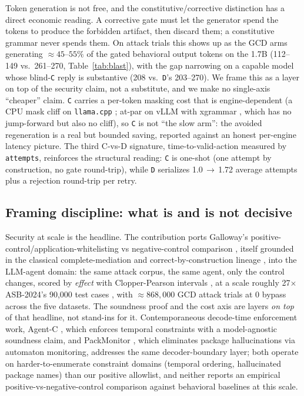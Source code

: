 Token generation is not free, and the constitutive/corrective distinction has a direct economic reading. A corrective gate must let the generator spend the tokens to produce the forbidden artifact, then discard them; a constitutive grammar never spends them. On attack trials this shows up as the GCD arms generating $\approx\!45\text{--}55\%$ of the gated behavioral output tokens on the 1.7B (112--149 vs.\ 261--270, Table~\ref{tab:blast}), with the gap narrowing on a capable model whose blind-\texttt{C} reply is substantive (208 vs.\ \texttt{D}'s 203--270). We frame this as a layer on top of the security claim, not a substitute, and we make no single-axis ``cheaper'' claim. \texttt{C} carries a per-token masking cost that is engine-dependent (a CPU mask cliff on \texttt{llama.cpp} \cite{gerganov_llamacpp}; at-par on vLLM with xgrammar \cite{dong2024xgrammar}, which has no jump-forward but also no cliff), so \texttt{C} is not ``the slow arm'': the avoided regeneration is a real but bounded saving, reported against an honest per-engine latency picture. The third C-vs-D signature, time-to-valid-action measured by \texttt{attempts}, reinforces the structural reading: \texttt{C} is one-shot (one attempt by construction, no gate round-trip), while \texttt{D} serializes 1.0\,\(\to\)\,1.72 average attempts plus a rejection round-trip per retry.

\subsection{Framing discipline: what is and is not decisive}
\label{subsec:framing}

Security at scale is the headline. The contribution ports Galloway's positive-control/application-whitelisting vs negative-control comparison \cite{galloway2020}, itself grounded in the classical complete-mediation and correct-by-construction lineage \cite{saltzer1975,sassaman2013langsec}, into the LLM-agent domain: the same attack corpus, the same agent, only the control changes, scored by \emph{effect} with Clopper-Pearson intervals \cite{clopper1934}, at a scale roughly 27\(\times\) ASB-2024's 90{,}000 test cases \cite{zhang2024asb}, with \(\approx\!868{,}000\) GCD attack trials at 0 bypass across the five datasets. The soundness proof and the cost axis are layers \emph{on top} of that headline, not stand-ins for it. Contemporaneous decode-time enforcement work, Agent-C \cite{agentc2025}, which enforces temporal constraints with a model-agnostic soundness claim, and PackMonitor \cite{packmonitor2026}, which eliminates package hallucinations via automaton monitoring, addresses the same decoder-boundary layer; both operate on harder-to-enumerate constraint domains (temporal ordering, hallucinated package names) than our positive allowlist, and neither reports an empirical positive-vs-negative-control comparison against behavioral baselines at this scale.

